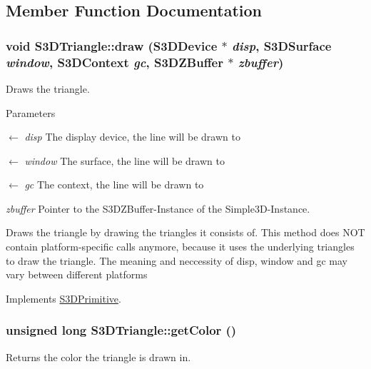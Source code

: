\subsection{Member Function Documentation}
\hypertarget{class_s3_d_triangle_acf6924908c89d6bbc5af23769243beaf}{
\subsubsection[{draw}]{\setlength{\rightskip}{0pt plus 5cm}void S3DTriangle::draw (S3DDevice $\ast$ {\em disp}, \/  S3DSurface {\em window}, \/  S3DContext {\em gc}, \/  {\bf S3DZBuffer} $\ast$ {\em zbuffer})}}
\label{class_s3_d_triangle_acf6924908c89d6bbc5af23769243beaf}


Draws the triangle. 


\begin{DoxyParams}{Parameters}
\item[\mbox{$\leftarrow$} {\em disp}]The display device, the line will be drawn to \item[\mbox{$\leftarrow$} {\em window}]The surface, the line will be drawn to \item[\mbox{$\leftarrow$} {\em gc}]The context, the line will be drawn to \item[{\em zbuffer}]Pointer to the S3DZBuffer-\/Instance of the Simple3D-\/Instance.\end{DoxyParams}
Draws the triangle by drawing the triangles it consists of. This method does NOT contain platform-\/specific calls anymore, because it uses the underlying triangles to draw the triangle. The meaning and neccessity of disp, window and gc may vary between different platforms 

Implements \hyperlink{class_s3_d_primitive_a857f042bc63ae6233b63b60089e92b81}{S3DPrimitive}.

\hypertarget{class_s3_d_triangle_ade8ba96094206ee3dff5c3bc743e0a1c}{
\subsubsection[{getColor}]{\setlength{\rightskip}{0pt plus 5cm}unsigned long S3DTriangle::getColor ()}}
\label{class_s3_d_triangle_ade8ba96094206ee3dff5c3bc743e0a1c}


Returns the color the triangle is drawn in. 


